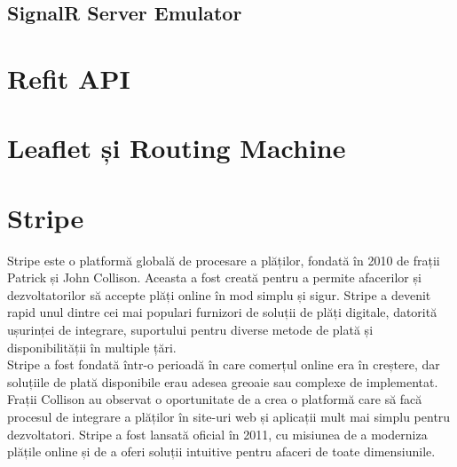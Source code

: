 \subsection{SignalR Server Emulator}
\section{Refit API}
\section{Leaflet și Routing Machine}
\section{Stripe}
 {\hspace*{1cm} Stripe este o platformă globală de procesare a plăților, fondată în 2010 de frații Patrick și
  John Collison. Aceasta a fost creată pentru a permite afacerilor și dezvoltatorilor să accepte plăți
  online în mod simplu și sigur. Stripe a devenit rapid unul dintre cei mai populari furnizori de
  soluții de plăți digitale, datorită ușurinței de integrare, suportului pentru diverse metode de plată
  și disponibilității în multiple țări.}\parencite{stripe}\\
{\hspace*{1cm} Stripe a fost fondată într-o perioadă în care comerțul online era în creștere, dar soluțiile de
plată disponibile erau adesea greoaie sau complexe de implementat. Frații Collison au observat o
oportunitate de a crea o platformă care să facă procesul de integrare a plăților în site-uri web și
aplicații mult mai simplu pentru dezvoltatori. Stripe a fost lansată oficial în 2011, cu misiunea de
a moderniza plățile online și de a oferi soluții intuitive pentru afaceri de toate dimensiunile.}\parencite{stripe}